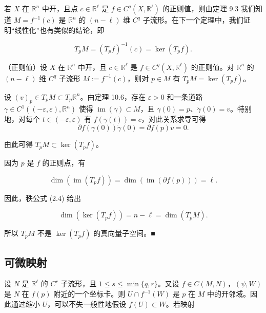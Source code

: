 若 $ X $ 在 $ \mathbb{R}^{n} $ 中开，且点 $ c \in \mathbb{R}^{\ell} $ 是 $ f \in C^{q}(X,\mathbb{R}^{\ell}) $ 的正则值，则由定理 9.3 我们知道 $ M = f^{-1}(c) $ 是 $ \mathbb{R}^{n} $ 的 $ (n-\ell) $ 维 $ C^{q} $ 子流形。在下一个定理中，我们证明“线性化”也有类似的结论，即

\[
T_{p}M = (T_{p}f)^{-1}(c) = \ker(T_{p}f) .
\]

\begin{theorem}

（正则值）设 $ X $ 在 $ \mathbb{R}^{n} $ 中开，且 $ c \in \mathbb{R}^{\ell} $ 是 $ f \in C^{q}(X,\mathbb{R}^{\ell}) $ 的正则值。对 $ \mathbb{R}^{n} $ 的 $ (n-\ell) $ 维 $ C^{q} $ 子流形 $ M := f^{-1}(c) $，则对 $ p \in M $ 有 $ T_{p}M = \ker(T_{p}f) $。

\proofhead
设 $ (v)_{p} \in T_{p}M \subset T_{p}\mathbb{R}^{n} $。由定理 10.6，存在 $ \varepsilon > 0 $ 和一条道路 $ \gamma \in C^{1}\left((-\varepsilon,\varepsilon),\mathbb{R}^{n}\right) $ 使得 $ \operatorname{im}(\gamma) \subset M $，且 $ \gamma(0) = p $、$ \dot{\gamma}(0) = v $。特别地，对每个 $ t \in (-\varepsilon,\varepsilon) $ 有 $ f\left(\gamma(t)\right) = c $，对此关系求导可得
\[
\partial f\left(\gamma(0)\right)\dot{\gamma}(0) = \partial f(p)v = 0 .
\]

由此可得 $ T_{p}M \subset \ker(T_{p}f) $。

因为 $ p $ 是 $ f $ 的正则点，有

\[
\dim\left(\operatorname{im}(T_{p}f)\right) = \dim\left(\operatorname{im}(\partial f(p))\right) = \ell .
\]

因此，秩公式 (2.4) 给出

\[
\dim\left(\ker(T_{p}f)\right) = n - \ell = \dim(T_{p}M) .
\]

所以 $ T_{p}M $ 不是 $ \ker(T_{p}f) $ 的真向量子空间。\nobreak\hspace{0.35em}■

\end{theorem}

\subsection*{可微映射}

设 $ N $ 是 $ \mathbb{R}^{\ell} $ 的 $ C^{r} $ 子流形，且 $ 1 \le s \le \min\{q,r\} $。又设 $ f \in C(M,N) $，$ (\psi,W) $ 是 $ N $ 在 $ f(p) $ 附近的一个坐标卡。则 $ U\cap f^{-1}(W) $ 是 $ p $ 在 $ M $ 中的开邻域。因此通过缩小 $ U $，可以不失一般性地假设 $ f(U) \subset W $。若映射


